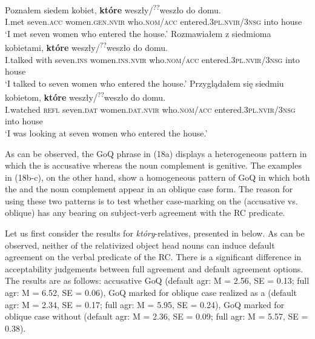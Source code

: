\documentclass[output=paper]{langsci/langscibook}
\begin{document}
\ea%
    \label{ex:leska:18}
    \ea
    \gll Poznałem   siedem   kobiet,   \textbf{które}     weszły/\textsuperscript{??}weszło   do   domu.  \\
          I.met   seven.\textsc{acc}   women.\textsc{gen.nvir}  who.\textsc{nom/acc} entered.\textsc{3pl.nvir}/\textsc{3nsg}   into  house  \\
    \glt ‘I met seven women who entered the house.’
    \ex
    \gll Rozmawiałem   z   siedmioma  kobietami,  \textbf{które}                                                          weszły/\textsuperscript{??}weszło   do   domu.\\
         I.talked   with   seven.\textsc{ins}   women.\textsc{ins.nvir}  who.\textsc{nom/acc}      entered.\textsc{3pl.nvir}/\textsc{3nsg} into   house   \\
    \glt ‘I talked to seven women who entered the house.’
    \ex 
    \gll Przyglądałem się   siedmiu   kobietom,    \textbf{które}    weszły/\textsuperscript{??}weszło       do   domu.\\
         I.watched    \textsc{refl}   seven.\textsc{dat}   women.\textsc{dat.nvir}   who.\textsc{nom/acc} entered.\textsc{3pl.nvir}/\textsc{3nsg}   into house \\
    \glt ‘I was looking at seven women who entered the house.’
    \z
\z
  
As can be observed, the GoQ phrase in (18a) displays a heterogeneous pattern in which the  is accusative whereas the noun complement is genitive. The examples in (18b-c), on the other hand, show a homogeneous pattern of GoQ in which both the  and the noun complement appear in an oblique case form. The reason for using these two patterns is to test whether case-marking on the  (accusative vs. oblique) has any bearing on subject-verb agreement with the RC predicate.

Let us first consider the results for \textit{który}{}-relatives, presented in  below. As can be observed, neither of the relativized object head nouns can induce default agreement on the verbal predicate of the RC. There is a significant difference in acceptability judgements between full agreement and default agreement options. The results are as follows: accusative GoQ (default agr: M = 2.56, SE = 0.13; full agr: M = 6.52, SE = 0.06), GoQ marked for oblique case realized as a  (default agr: M = 2.34, SE = 0.17; full agr: M = 5.95, SE = 0.24), GoQ marked for oblique case without  (default agr: M = 2.36, SE = 0.09; full agr: M = 5.57, SE = 0.38).
\end{document}
